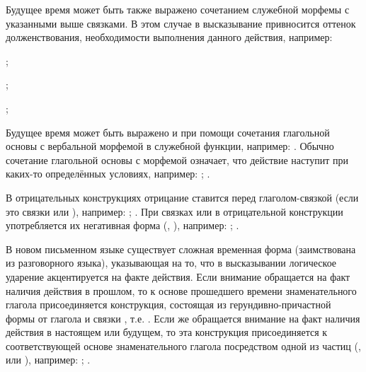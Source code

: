 Будущее время может быть также выражено сочетанием служебной морфемы  с указанными выше связками. В этом случае в высказывание привносится оттенок долженствования, необходимости выполнения данного действия, например:
\begin{description}
	\item{};
	\item{};
	\item{};
\end{description}

Будущее время может быть выражено и при помощи сочетания глагольной основы с вербальной морфемой  в служебной функции, например:
.
Обычно сочетание глагольной основы с морфемой  означает, что действие наступит при каких-то определённых условиях, например:
;
.

В отрицательных конструкциях отрицание ставится перед глаголом-связкой (если это связки	 или ), например:
;
.
При связках	 или  в отрицательной конструкции употребляется их негативная форма (, ), например:
;
.

В новом письменном языке существует сложная временная форма (заимствована из разговорного языка), указывающая на то, что в высказывании логическое ударение акцентируется на факте действия. Если внимание обращается на факт наличия действия в прошлом, то к основе прошедшего времени знаменательного глагола присоединяется конструкция, состоящая из герундивно-причастной формы от глагола  и связки , т.е. . Если же обращается внимание на факт наличия действия в настоящем или будущем, то эта конструкция присоединяется к соответствующей основе знаменательного глагола посредством одной из частиц (,  или ), например:
;
.

